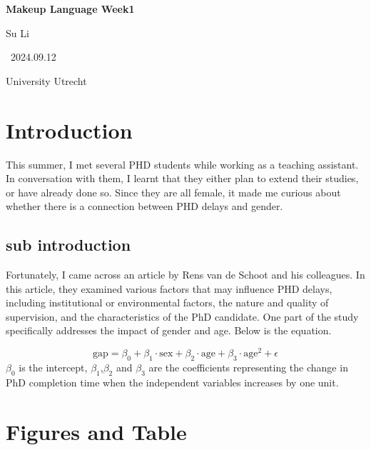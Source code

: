 \documentclass[10pt, a4paper, titlepage]{article}
\begin{document}

\begin{titlepage}
    \centering
    {\Huge\bfseries Makeup Language Week1\par} 
    \vspace{2cm}
    
    {\LARGE Su Li\par} 
    \vfill
    
    {\LARGE \ 2024.09.12 \par} 
    \vspace{1cm}
    
    {\LARGE University Utrecht\par} 
\end{titlepage}



\section{Introduction}
This summer, I met several PHD students while working as a teaching assistant. In conversation with them, I learnt that they either plan to extend their studies, or have already done so. Since they are all female, it made me curious about whether there is a connection between PHD delays and gender.

\subsection{sub introduction}
Fortunately, I came across an article by Rens van de Schoot and his colleagues. In this article, they examined various factors that may influence PHD delays, including institutional or environmental factors, the nature and quality of supervision, and the characteristics of the PhD candidate. One part of the study specifically addresses the impact of gender and age. Below is the equation.

\begin{equation}
\text{gap} = \beta_0 + \beta_1 \cdot \text{sex} + \beta_2 \cdot \text{age} + \beta_3 \cdot \text{age}^2 + \epsilon
\end{equation}
$\beta_0$ is the intercept, $\beta_1$,$\beta_2$ and $\beta_3$ are the coefficients representing the change in PhD completion time when the independent variables increases by one unit.


\newpage
\section{Figures and Table}
\end{document}
